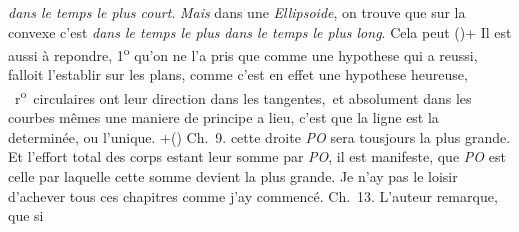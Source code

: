 %
%
\textit{dans le temps le plus court}.
%
 \textit{Mais} dans une \textit{Ellipsoide}, on trouve que 
%
sur la convexe c'est \textit{dans le temps le plus}
%
%
\textit{dans le temps le plus long}. 
%
Cela peut 
%
(\protect\vphantom)+ Il est aussi à repondre, 1\textsuperscript{o} qu'on ne l'a pris que comme une hypothese qui a reussi,
%
%
falloit l'establir sur les plans, comme c'est en effet une hypothese heureuse, 
%
%
~r\textsuperscript{o}\rbrack\ circulaires ont leur direction dans les tangentes\lbrack,\rbrack\ et
%
%
absolument dans les courbes mêmes une maniere de principe a lieu, 
%
c'est que la ligne est la 
%
%
determinée, ou l'unique. 
%
\lbrack+\protect\vphantom()\rbrack \pend
%
\pstart Ch.~9.
%
%
cette droite \textit{PO} sera tousjours la plus grande. 
%
Et l'effort total des corps estant leur somme par \textit{PO}, il est manifeste, que \textit{PO} est celle 
%
par laquelle cette somme devient la plus grande.
%
Je n'ay pas le loisir d'achever tous ces chapitres comme j'ay commencé.
\pend
%
\pstart 
%
Ch.~13. L'auteur remarque, que si 
%
%
